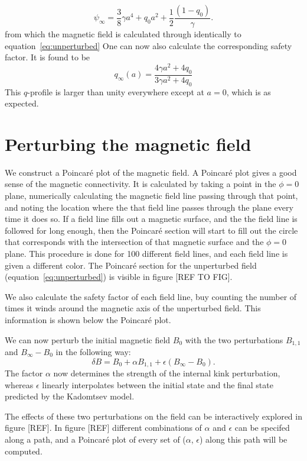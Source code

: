 \documentclass[%
superscriptaddress,
amsmath,amssymb,
aps,
pre,
floatfix,
]{revtex4-2}
\begin{document}
\begin{equation}
    \psi_\infty = \frac{3}{8} \gamma a^4 + q_0 a^2 + \frac{1}{2}  \frac{( 1 - q_0 )}{\gamma}.
\end{equation}
from which the magnetic field is calculated through identically to equation~\eqref{eq:unperturbed}
One can now also calculate the corresponding safety factor. It is found to be
\begin{equation}
    q_\infty(a) = \frac{4 \gamma a^2 + 4 q_0}{3 \gamma a^2 + 4 q_0}
\end{equation}
This $q$-profile is larger than unity everywhere except at $a=0$, which is as expected.


\section*{Perturbing the magnetic field}
We construct a Poincar\'e plot of the magnetic field. 
A Poincar\'e plot gives a good sense of the magnetic connectivity. 
It is calculated by taking a point in the $\phi=0$ plane, numerically calculating the magnetic field line passing through that point, and noting the location where the that field line passes through the plane every time it does so. 
If a field line fills out a magnetic surface, and the the field line is followed for long enough, then the Poincar\'e section will start to fill out the circle that corresponds with the intersection of that magnetic surface and the $\phi=0$ plane. 
This procedure is done for 100 different field lines, and each field line is given a different color.
The Poincar\'e section for the unperturbed field (equation~\eqref{eq:unperturbed}) is visible in figure [REF TO FIG]. 

We also calculate the safety factor of each field line, buy counting the number of times it winds around the magnetic axis of the unperturbed field. 
This information is shown below the Poincar\'e plot. 

We can now perturb the initial magnetic field $B_0$ with the two perturbations $B_{1,1}$ and $B_\infty -B_0$ in the following way: 
\begin{equation}\label{eq:totalfield}
    \delta B =  B_0 + \alpha B_{1,1}+ \epsilon (B_\infty -B_0). 
\end{equation}
The factor $\alpha$ now determines the strength of the internal kink perturbation, whereas $\epsilon$ linearly interpolates between the initial state and the final state predicted by the Kadomtsev model. 

The effects of these two perturbations on the field can be interactively explored in figure [REF]. 
In figure [REF] different combinations of $\alpha$ and $\epsilon$ can be specifed along a path, and a Poincar\'e plot of every set of ($\alpha$, $\epsilon$) along this path will be computed. 
\end{document}
